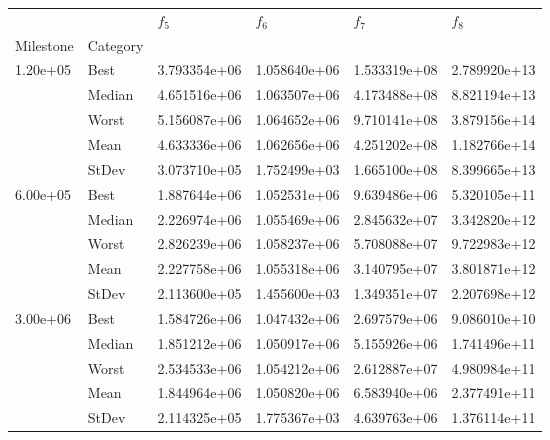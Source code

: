 \begin{tabular}{llllll}
\toprule
         &      &      $f_{5}$ &      $f_{6}$ &      $f_{7}$ &      $f_{8}$ \\
Milestone & Category &              &              &              &              \\
\midrule
\multirow{5}{*}{1.20e+05} & Best & 3.793354e+06 & 1.058640e+06 & 1.533319e+08 & 2.789920e+13 \\
         & Median & 4.651516e+06 & 1.063507e+06 & 4.173488e+08 & 8.821194e+13 \\
         & Worst & 5.156087e+06 & 1.064652e+06 & 9.710141e+08 & 3.879156e+14 \\
         & Mean & 4.633336e+06 & 1.062656e+06 & 4.251202e+08 & 1.182766e+14 \\
         & StDev & 3.073710e+05 & 1.752499e+03 & 1.665100e+08 & 8.399665e+13 \\
\cline{1-6}
\multirow{5}{*}{6.00e+05} & Best & 1.887644e+06 & 1.052531e+06 & 9.639486e+06 & 5.320105e+11 \\
         & Median & 2.226974e+06 & 1.055469e+06 & 2.845632e+07 & 3.342820e+12 \\
         & Worst & 2.826239e+06 & 1.058237e+06 & 5.708088e+07 & 9.722983e+12 \\
         & Mean & 2.227758e+06 & 1.055318e+06 & 3.140795e+07 & 3.801871e+12 \\
         & StDev & 2.113600e+05 & 1.455600e+03 & 1.349351e+07 & 2.207698e+12 \\
\cline{1-6}
\multirow{5}{*}{3.00e+06} & Best & 1.584726e+06 & 1.047432e+06 & 2.697579e+06 & 9.086010e+10 \\
         & Median & 1.851212e+06 & 1.050917e+06 & 5.155926e+06 & 1.741496e+11 \\
         & Worst & 2.534533e+06 & 1.054212e+06 & 2.612887e+07 & 4.980984e+11 \\
         & Mean & 1.844964e+06 & 1.050820e+06 & 6.583940e+06 & 2.377491e+11 \\
         & StDev & 2.114325e+05 & 1.775367e+03 & 4.639763e+06 & 1.376114e+11 \\
\bottomrule
\end{tabular}

